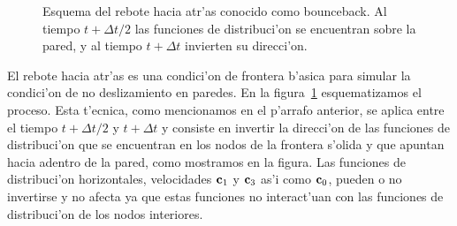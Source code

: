 \begin{figure}
\centering
%
\caption{\label{fig:bounceback}
Esquema del rebote hacia atr'as conocido como bounceback. Al tiempo $t+\Delta t/2$ las funciones
de distribuci'on se encuentran sobre la pared, y al tiempo $t+\Delta t$ invierten su direcci'on.
}
\end{figure}



El rebote hacia atr'as es una condici'on de frontera b'asica para simular la condici'on
de no deslizamiento en paredes. En la figura~\ref{fig:bounceback} esquematizamos  el proceso.
Esta t'ecnica, como mencionamos en el p'arrafo anterior, se aplica entre el tiempo
$t +\Delta t/2$ y $t +\Delta t$  y consiste en invertir la direcci'on de las funciones
de distribuci'on que se encuentran en los nodos de la frontera s'olida y que apuntan
hacia adentro de la pared, como mostramos en la figura. Las funciones de distribuci'on
horizontales, velocidades $\textbf c_1$ y $\textbf c_3$ as'i como $\textbf c_0$, pueden o no invertirse y no
afecta ya que estas funciones no interact'uan con las funciones de distribuci'on de los 
nodos interiores.







